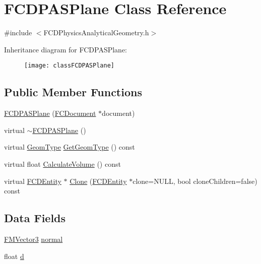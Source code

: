 \hypertarget{classFCDPASPlane}{
\section{FCDPASPlane Class Reference}
\label{classFCDPASPlane}
}


{\ttfamily \#include $<$FCDPhysicsAnalyticalGeometry.h$>$}

Inheritance diagram for FCDPASPlane:\begin{figure}[H]
\begin{center}
\leavevmode
\texttt{[image: classFCDPASPlane]}
\end{center}
\end{figure}
\subsection*{Public Member Functions}
\begin{DoxyCompactItemize}
\item 
\hyperlink{classFCDPASPlane_a65438664ddc3091e3060f8e0d7130d47}{FCDPASPlane} (\hyperlink{classFCDocument}{FCDocument} $\ast$document)
\item 
virtual \hyperlink{classFCDPASPlane_a5c1223799ef22e7c3247408bf540b21d}{$\sim$FCDPASPlane} ()
\item 
virtual \hyperlink{classFCDPhysicsAnalyticalGeometry_a511583406e5c6a1bb5bd84c0453a452c}{GeomType} \hyperlink{classFCDPASPlane_a88c6bbffd989b9215b09199c876065ea}{GetGeomType} () const 
\item 
virtual float \hyperlink{classFCDPASPlane_a49e8a7d34eacf41708585e199716728d}{CalculateVolume} () const 
\item 
virtual \hyperlink{classFCDEntity}{FCDEntity} $\ast$ \hyperlink{classFCDPASPlane_aa2d319eebf56f8967dba2cba55df41cb}{Clone} (\hyperlink{classFCDEntity}{FCDEntity} $\ast$clone=NULL, bool cloneChildren=false) const 
\end{DoxyCompactItemize}
\subsection*{Data Fields}
\begin{DoxyCompactItemize}
\item 
\hyperlink{classFMVector3}{FMVector3} \hyperlink{classFCDPASPlane_a5da0322269f7ab44f82328d6a683094e}{normal}
\item 
float \hyperlink{classFCDPASPlane_a5f72c671f3ffd919544ee4902ec39b60}{d}
\end{DoxyCompactItemize}


